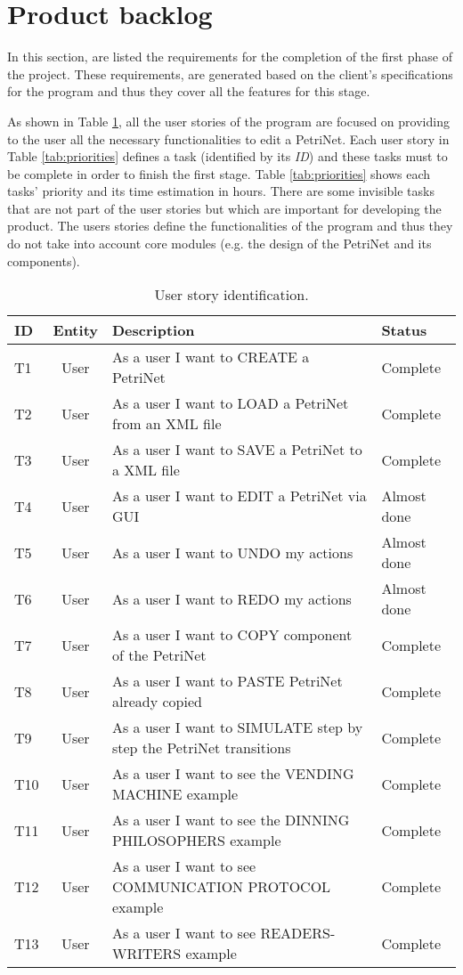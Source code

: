 
\section{Product backlog}

In this section, are listed the requirements for the completion of the first phase of the project. These requirements, are generated based on the client's specifications for the program and thus they cover all the features for this stage.

As shown in Table \ref{tab:user_stories}, all the user stories of the program are focused on providing to the user all the necessary functionalities to edit a PetriNet. Each user story in Table \ref{tab:priorities} defines a task (identified by its \emph{ID}) and these tasks must to be complete in order to finish the first stage. Table \ref{tab:priorities} shows each tasks' priority and its time estimation in hours. There are some invisible tasks that are not part of the user stories but which are important for developing the product. The users stories define the functionalities of the program and thus they do not take into account core modules (e.g. the design of the PetriNet and its components). 



\begin{table}[h]
\centering
\begin{tabular}{ |l|c|l|l| } 
 \hline
 \bf{ID} & \bf{Entity} & \bf{Description} & \bf{Status} \\ 
 \hline
 T1 & User & As a user I want to CREATE a PetriNet & Complete\\ 
 T2 & User & As a user I want to LOAD a PetriNet from an XML file & Complete\\ 
 T3 & User & As a user I want to SAVE a PetriNet to a XML file & Complete\\ 
 T4 & User & As a user I want to EDIT a PetriNet via GUI & Almost done\\ 
 T5 & User & As a user I want to UNDO my actions & Almost done \\
 T6 & User & As a user I want to REDO my actions & Almost done \\
 T7 & User & As a user I want to COPY component of the PetriNet & Complete\\ 
 T8 & User & As a user I want to PASTE PetriNet already copied & Complete\\ 
 T9 & User & As a user I want to SIMULATE step by step the PetriNet transitions & Complete\\ 
 T10 & User & As a user I want to see the VENDING MACHINE example & Complete\\ 
 T11 & User & As a user I want to see the DINNING PHILOSOPHERS example & Complete\\ 
 T12 & User & As a user I want to see COMMUNICATION PROTOCOL example & Complete\\ 
 T13 & User & As a user I want to see READERS-WRITERS example & Complete\\ 
 \hline
\end{tabular}
\caption{User story identification.}
\label{tab:user_stories}
\end{table}

